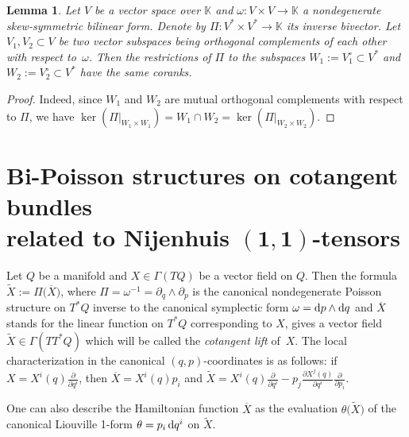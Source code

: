 \documentclass[pdftex]{sigma}
\numberwithin{equation}{section}
\newtheorem{Lemma}[Theorem]{Lemma}
\begin{document}
\begin{Lemma}\label{lemM}Let $V$ be a vector space over $\mathbb{K}$ and $\omega\colon V\times V\to \mathbb{K}$ a nondegenerate skew-symmetric bilinear form. Denote by $\Pi\colon V^*\times V^*\to\mathbb{K}$ its inverse bivector. Let $V_1,V_2 \subset V$ be two vector subspaces being orthogonal complements of each other with respect to~$\omega$. Then the restrictions of $\Pi$ to the subspaces $W_1:=V_1^\circ \subset V^*$ and $W_2:=V_2^\circ \subset V^*$ have the same coranks.
\end{Lemma}

\begin{proof} Indeed, since $W_1$ and $W_2$ are mutual orthogonal complements with respect to $\Pi$, we have $\ker(\Pi|_{W_1\times W_1})=W_1\cap W_2=\ker(\Pi|_{W_2\times W_2})$.
\end{proof}

\section[Bi-Poisson structures on cotangent bundles related to Nijenhuis $(1,1)$-tensors]{Bi-Poisson structures on cotangent bundles\\ related to Nijenhuis $\boldsymbol{(1,1)}$-tensors}\label{sec:Bi-Poisson}

\begin{Definition}\label{defi2}Let $Q$ be a manifold and $X\in \Gamma(TQ)$ be a vector field on $Q$. Then the formula $\widetilde X:=\Pi\big(\overline X\big)$, where $\Pi=\omega^{-1}=\partial_q\wedge\partial_p$ is the canonical nondegenerate Poisson structure on $T^*Q$ inverse to the canonical symplectic form $\omega={\rm d}p\wedge {\rm d}q$ and $\overline X$ stands for the linear function on $T^*Q$ corresponding to $X$, gives a vector field $\widetilde X\in\Gamma(TT^*Q)$ which will be called the {\em cotangent lift} of~$X$. The local characterization in the canonical $(q,p)$-coordinates is as follows: if $X=X^i(q)\frac{\partial }{\partial q^i}$, then $\overline{X}=X^i(q)p_i$ and $\widetilde X=X^i(q)\frac{\partial }{\partial q^i}-p_j\frac{\partial X^j(q)}{\partial q^i}\frac{\partial }{\partial p_i}$.
\end{Definition}

\begin{Remark}\label{reem} One can also describe the Hamiltonian function $\overline{X}$ as the evaluation $\theta\big(\widetilde{X}\big)$ of the canonical Liouville 1-form $\theta=p_i\,{\rm d}q^i$ on $\widetilde{X}$.
\end{Remark}
\end{document}
